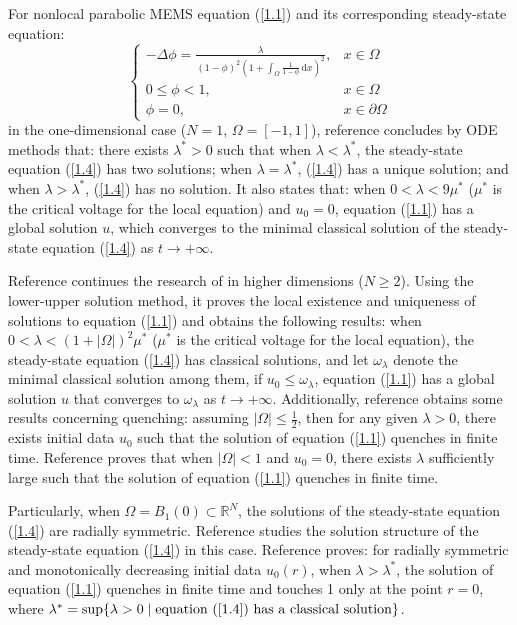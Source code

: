 \documentclass{article}
\numberwithin{equation}{section}
\begin{document}
For nonlocal parabolic MEMS equation (\ref{1.1}) and its corresponding steady-state equation:
\begin{equation}
    \begin{cases}
        -\Delta \phi=\frac{\lambda}{(1-\phi)^2(1+\int_{\Omega}\frac{1}{1-\phi}\,\mathrm{d}x)^2},&x\in\Omega\\
        0 \le \phi<1,&x\in\Omega\\
        \phi=0,&x\in\partial\Omega
    \end{cases}\label{1.4}
\end{equation}
in the one-dimensional case ($N=1$, $\Omega=[-1,1]$), reference \cite{ref1} concludes by ODE methods that: there exists $\lambda^{*} >0$ such that when $\lambda<\lambda^{*}$, the steady-state equation (\ref{1.4}) has two solutions; when $\lambda=\lambda^{*}$, (\ref{1.4}) has a unique solution; and when $\lambda>\lambda^{*}$, (\ref{1.4}) has no solution. It also states that: when $0<\lambda<9\mu^{*}$ ($\mu^{*}$ is the critical voltage for the local equation) and $u_0=0$, equation (\ref{1.1}) has a global solution $u$, which converges to the minimal classical solution of the steady-state equation (\ref{1.4}) as $t\to +\infty$.

Reference \cite{ref2} continues the research of \cite{ref1} in higher dimensions ($N\ge 2$). Using the lower-upper solution method, it proves the local existence and uniqueness of solutions to equation (\ref{1.1}) and obtains the following results: when $0<\lambda<(1+|\Omega|)^2\mu^{*}$ ($\mu^{*}$ is the critical voltage for the local equation), the steady-state equation (\ref{1.4}) has classical solutions, and let $\omega_{\lambda}$ denote the minimal classical solution among them, if $u_0\le \omega_{\lambda}$, equation (\ref{1.1}) has a global solution $u$ that converges to $\omega_{\lambda}$ as $t\to +\infty$. Additionally, reference \cite{ref2} obtains some results concerning quenching: assuming $|\Omega|\le \frac{1}{2}$, then for any given $\lambda>0$, there exists initial data $u_0$ such that the solution of equation (\ref{1.1}) quenches in finite time. Reference \cite{ref12} proves that when $|\Omega|<1$ and $u_0=0$, there exists $\lambda$ sufficiently large such that the solution of equation (\ref{1.1}) quenches in finite time.

Particularly, when $\Omega=B_1(0)\subset\mathbb{R}^{N}$, the solutions of the steady-state equation (\ref{1.4}) are radially symmetric. Reference \cite{ref2} studies the solution structure of the steady-state equation (\ref{1.4}) in this case. Reference \cite{ref5} proves: for radially symmetric and monotonically decreasing initial data $u_0(r)$, when $\lambda>\lambda^{*}$, the solution of equation (\ref{1.1}) quenches in finite time and touches 1 only at the point $r=0$, where $\lambda^{*}=\sup\{\lambda>0\mid \text{equation (\ref{1.4}) has a classical solution}\}$.
\end{document}
